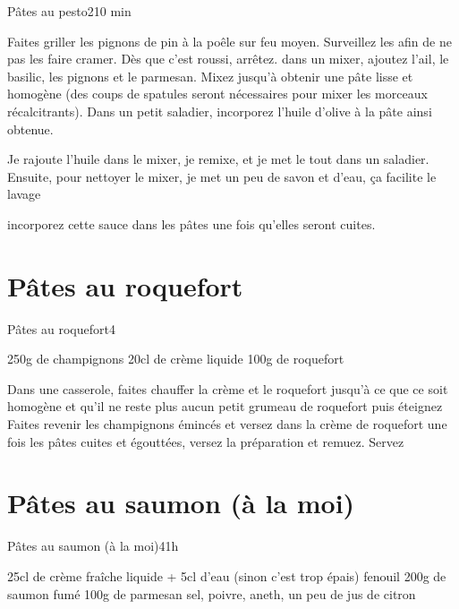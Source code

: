 {\begin{recette}{Pâtes au pesto}{2}{10 min}{}
\begin{preparation}
\etape Faites griller les pignons de pin à la poêle sur feu moyen. Surveillez les afin de ne pas les faire cramer. Dès que 
c'est roussi, arrêtez.
\etape dans un mixer, ajoutez l'ail, le basilic, les pignons et le parmesan. Mixez jusqu'à obtenir une pâte lisse et homogène 
(des coups de spatules seront nécessaires pour mixer les morceaux récalcitrants). 
\etape Dans un petit saladier, incorporez l'huile d'olive à la pâte ainsi obtenue. 
\begin{remarque}
Je rajoute l'huile dans le mixer, je remixe, et je met le tout dans un saladier. Ensuite, pour nettoyer le mixer, je met un peu 
de savon et d'eau, ça facilite le lavage
\end{remarque}
\etape incorporez cette sauce dans les pâtes une fois qu'elles seront cuites. 

\end{preparation}
\end{recette}

\section{Pâtes au roquefort}
\begin{recette}{Pâtes au roquefort}{4}{}{}
\begin{ingredients}
\ingredient 250g de champignons
\ingredient 20cl de crème liquide
\ingredient 100g de roquefort
\end{ingredients}

\begin{preparation}
\etape Dans une casserole, faites chauffer la crème et le roquefort jusqu'à ce que ce soit homogène et qu'il ne reste plus 
aucun petit grumeau de roquefort puis éteignez
\etape Faites revenir les champignons émincés et versez dans la crème de roquefort
\etape une fois les pâtes cuites et égouttées, versez la préparation et remuez. 
\etape Servez
\end{preparation}
\end{recette}

\section{Pâtes au saumon (à la moi)}
\begin{recette}{Pâtes au saumon (à la moi)}{4}{1h}{}
\begin{ingredients}
\ingredient 25cl de crème fraîche liquide + 5cl d'eau (sinon c'est trop épais)
 fenouil
\ingredient 200g de saumon fumé
\ingredient 100g de parmesan
\ingredient sel, poivre, aneth, un peu de jus de citron
\end{ingredients}


\end{recette}}
